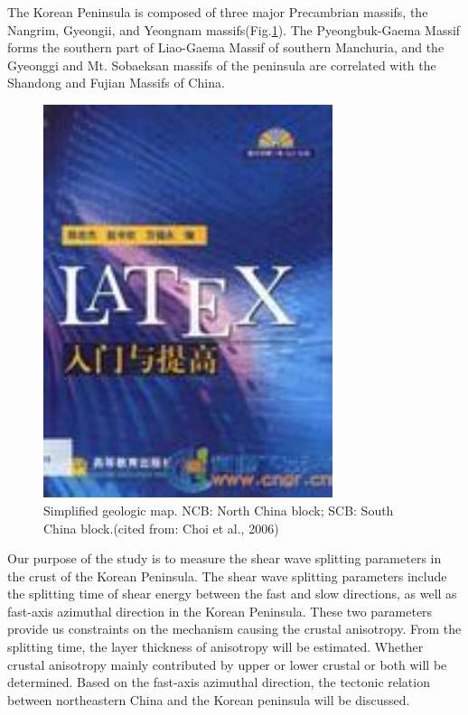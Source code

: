 \documentclass{article}
\begin{document}
The Korean Peninsula is composed of three major Precambrian massifs, the Nangrim, Gyeongii, and Yeongnam massifs(Fig.\ref{geomap}). The Pyeongbuk-Gaema Massif forms the southern part of Liao-Gaema Massif of southern Manchuria, and the Gyeonggi and Mt. Sobaeksan massifs of the peninsula are correlated with the Shandong and Fujian Massifs of China. 
%
\begin{figure}[htbp]
\begin{center}
\includegraphics[width=0.755\textwidth]{crustalsplit.jpg}
\caption{Simplified geologic map. NCB: North China block; SCB: South China block.(cited from: Choi et al., 2006)}
\label{geomap}
\end{center}
\end{figure}
%

Our purpose of the study is to measure the shear wave splitting parameters in the crust of the Korean Peninsula. The shear wave splitting parameters include the splitting time of shear energy 
between the fast and slow directions, as well as fast-axis azimuthal direction in the Korean Peninsula. These two parameters provide us constraints on the mechanism causing the crustal anisotropy. From the splitting time, the layer thickness of anisotropy will be estimated. Whether crustal anisotropy mainly contributed by upper or lower crustal or both will be determined. Based on the fast-axis azimuthal direction, the tectonic relation between northeastern China and the Korean peninsula will be discussed. 
\end{document}
